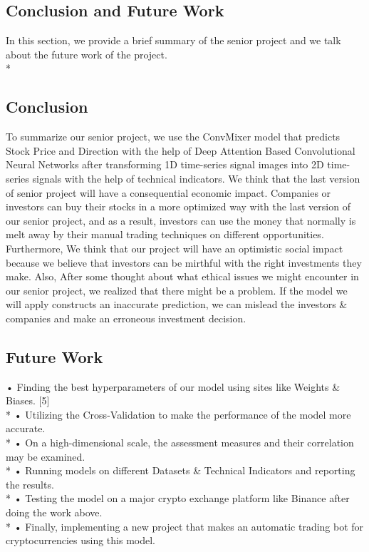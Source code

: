 \documentclass{article}
\begin{document}
\begin{center}
    \section{Conclusion and Future Work}
\end{center}
In this section, we provide a brief summary of the senior project and we talk about the future work of the project.\\*
\subsection{Conclusion}
To summarize our senior project, we use the ConvMixer model that predicts Stock Price and Direction with the help of Deep Attention Based Convolutional Neural Networks after transforming 1D time-series signal images into 2D time-series signals with the help of technical indicators. We think that the last version of senior project will have a consequential economic impact. Companies or investors can buy their stocks in a more optimized way with the last version of our senior project, and as a result, investors can use the money that normally is melt away by their manual trading techniques on different opportunities. Furthermore, We think that our project will have an optimistic social impact because we believe that investors can be mirthful with the right investments they make. Also, After some thought about what ethical issues we might encounter in our senior project, we realized that there might be a problem. If the model we will apply constructs an inaccurate prediction, we can mislead the investors \& companies and make an erroneous investment decision.
\subsection{Future Work}
• Finding the best hyperparameters of our model using sites like Weights \& Biases. [5]\\*
• Utilizing the Cross-Validation to make the performance of the model more accurate.\\*
• On a high-dimensional scale, the assessment measures and their correlation may be examined.\\*
• Running models on different Datasets \& Technical Indicators and reporting the results.\\*
• Testing the model on a major crypto exchange platform like Binance after doing the work above.\\*
• Finally, implementing a new project that makes an automatic trading bot for cryptocurrencies using this model.
\end{document}
